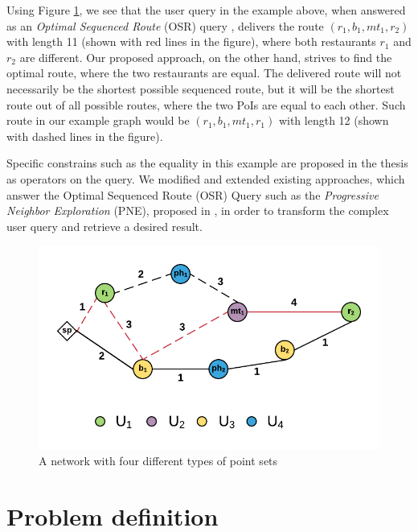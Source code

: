 Using Figure \ref{fig:example}, we see that the user query in the example above, when answered as an \textit{Optimal Sequenced Route} (OSR) query \cite{OSR}, delivers the route $(r_1, b_1, mt_1, r_2)$ with length 11 (shown with red lines in the figure), where both restaurants $r_1$ and $r_2$ are different. Our proposed approach, on the other hand, strives to find the optimal route, where the two restaurants are equal. The delivered route will not necessarily be the shortest possible sequenced route, but it will be the shortest route out of all possible routes, where the two PoIs are equal to each other. Such route in our example graph would be $(r_1, b_1, mt_1, r_1)$ with length 12 (shown with dashed lines in the figure).

Specific constrains such as the equality in this example are proposed in the thesis as operators on the query. We modified and extended existing approaches, which answer the Optimal Sequenced Route (OSR) Query such as the \textit{Progressive Neighbor Exploration} (PNE), proposed in \cite{OSR}, in order to transform the complex user query and retrieve a desired result.

\begin{figure}[h]
	\includegraphics[scale=1]{images/Example_routes.png}
	\centering
	\caption{A network with four different types of point sets}
	\label{fig:example}
\end{figure}

\section{Problem definition}

